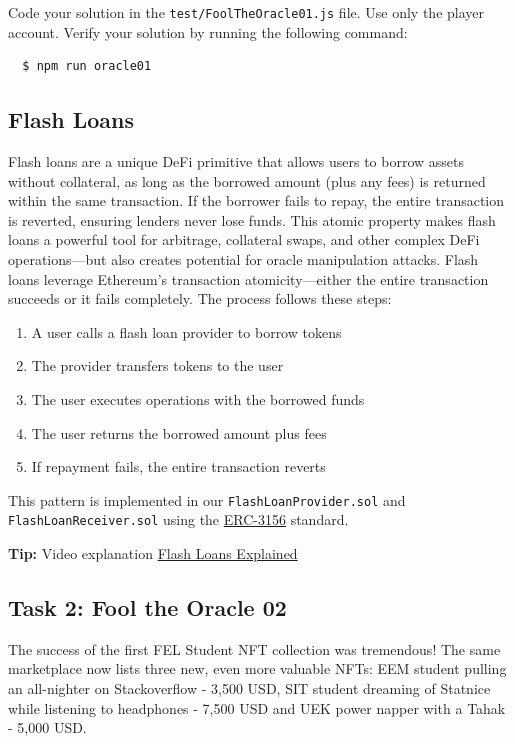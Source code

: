 \documentclass[12pt]{article}
\begin{document}
\noindent
Code your solution in the \texttt{test/FoolTheOracle01.js} file. Use only the player account. Verify your solution by running the following command:

\begin{verbatim}
  $ npm run oracle01
\end{verbatim}

\subsection*{Flash Loans}

Flash loans are a unique DeFi primitive that allows users to borrow assets without collateral, as long as the borrowed amount (plus any fees) is returned within the same transaction. If the borrower fails to repay, the entire transaction is reverted, ensuring lenders never lose funds. This atomic property makes flash loans a powerful tool for arbitrage, collateral swaps, and other complex DeFi operations—but also creates potential for oracle manipulation attacks. Flash loans leverage Ethereum's transaction atomicity—either the entire transaction succeeds or it fails completely. The process follows these steps:

\begin{enumerate}
    \item A user calls a flash loan provider to borrow tokens
    \item The provider transfers tokens to the user
    \item The user executes operations with the borrowed funds
    \item The user returns the borrowed amount plus fees
    \item If repayment fails, the entire transaction reverts
\end{enumerate}

This pattern is implemented in our \texttt{FlashLoanProvider.sol} and \texttt{FlashLoanReceiver.sol} using the \href{https://eips.ethereum.org/EIPS/eip-3156}{ERC-3156} standard.

\medskip
\noindent
\textbf{Tip:} Video explanation \href{https://www.youtube.com/watch?v=mCJUhnXQ76s}{Flash Loans Explained}

\subsection*{Task 2: Fool the Oracle 02}

The success of the first FEL Student NFT collection was tremendous! The same marketplace now lists three new, even more valuable NFTs: EEM student pulling an all-nighter on Stackoverflow - 3,500 USD, SIT student dreaming of Statnice while listening to headphones - 7,500 USD and UEK power napper with a Tahak - 5,000 USD.
\end{document}
